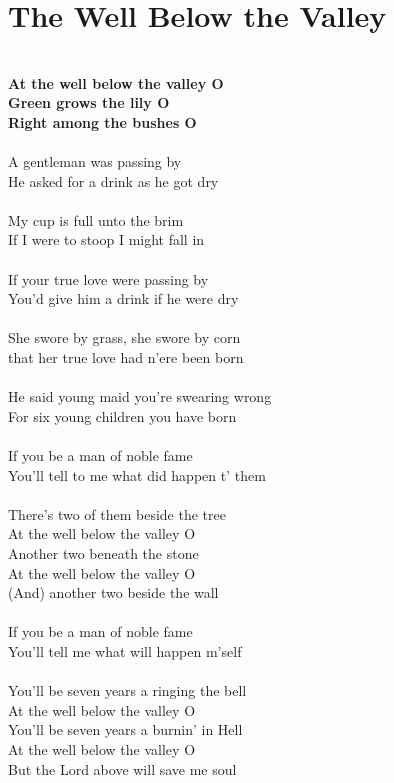 \documentclass[letterpaper,9pt]{article}
\begin{document}
\section{The Well Below the Valley}
\noindent
\\\textbf{At the well below the valley O
\\Green grows the lily O
\\Right among the bushes O}
\\
\\A gentleman was passing by
\\He asked for a drink as he got dry
\\
\\My cup is full unto the brim
\\If I were to stoop I might fall in
\\
\\If your true love were passing by
\\You'd give him a drink if he were dry
\\
\\She swore by grass, she swore by corn
\\that her true love had n'ere been born
\\
\\He said young maid you're swearing wrong
\\For six young children you have born
\\
\\If you be a man of noble fame
\\You'll tell to me what did happen t' them
\\
\\There's two of them beside the tree
\\At the well below the valley O
\\Another two beneath the stone
\\At the well below the valley O
\\(And) another two beside the wall
\\
\\If you be a man of noble fame
\\You'll tell me what will happen m'self
\\
\\You'll be seven years a ringing the bell
\\At the well below the valley O
\\You'll be seven years a burnin' in Hell
\\At the well below the valley O
\\But the Lord above will save me soul
\end{document}
